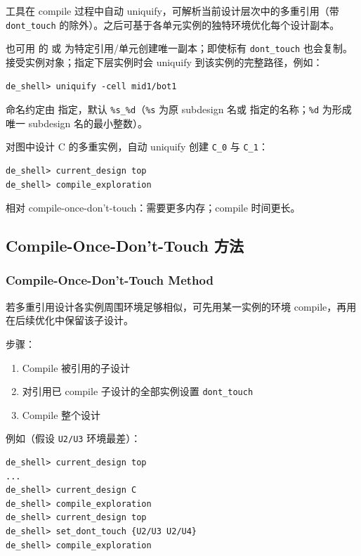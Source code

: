 工具在 compile 过程中自动 uniquify，可解析当前设计层次中的多重引用（带 \texttt{dont\_touch} 的除外）。之后可基于各单元实例的独特环境优化每个设计副本。

也可用  的  或  为特定引用/单元创建唯一副本；即使标有 \texttt{dont\_touch} 也会复制。 接受实例对象；指定下层实例时会 uniquify 到该实例的完整路径，例如：
\begin{lstlisting}
de_shell> uniquify -cell mid1/bot1
\end{lstlisting}

命名约定由  指定，默认 \texttt{\%s\_\%d}（\texttt{\%s} 为原 subdesign 名或  指定的名称；\texttt{\%d} 为形成唯一 subdesign 名的最小整数）。

对图中设计 C 的多重实例，自动 uniquify 创建 \texttt{C\_0} 与 \texttt{C\_1}：
\begin{lstlisting}
de_shell> current_design top
de_shell> compile_exploration
\end{lstlisting}


相对 compile-once-don't-touch：需要更多内存；compile 时间更长。

\subsection{Compile-Once-Don't-Touch 方法}
\subsubsection*{Compile-Once-Don't-Touch Method}

若多重引用设计各实例周围环境足够相似，可先用某一实例的环境 compile，再用  在后续优化中保留该子设计。

步骤：
\begin{enumerate}
  \item Compile 被引用的子设计
  \item 对引用已 compile 子设计的全部实例设置 \texttt{dont\_touch}
  \item Compile 整个设计
\end{enumerate}

例如（假设 \texttt{U2/U3} 环境最差）：
\begin{lstlisting}
de_shell> current_design top
...
de_shell> current_design C
de_shell> compile_exploration
de_shell> current_design top
de_shell> set_dont_touch {U2/U3 U2/U4}
de_shell> compile_exploration
\end{lstlisting}

